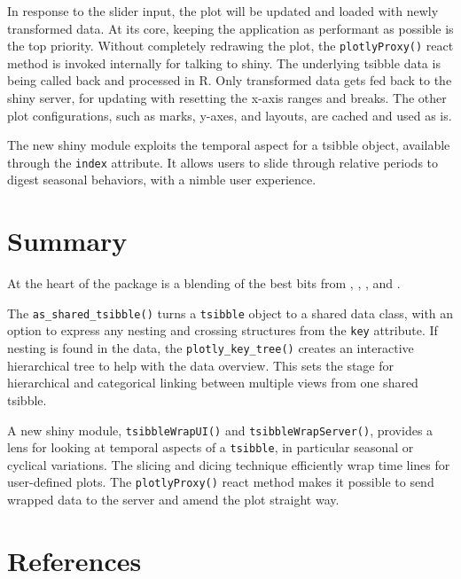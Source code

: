 In response to the slider input, the plot will be updated and loaded with newly transformed data. At its core, keeping the application as performant as possible is the top priority. Without completely redrawing the plot, the \texttt{plotlyProxy()} react method is invoked internally for talking to shiny. The underlying tsibble data is being called back and processed in R. Only transformed data gets fed back to the shiny server, for updating with resetting the x-axis ranges and breaks. The other plot configurations, such as marks, y-axes, and layouts, are cached and used as is.

The new shiny module exploits the temporal aspect for a tsibble object, available through the \texttt{index} attribute. It allows users to slide through relative periods to digest seasonal behaviors, with a nimble user experience.

\hypertarget{summary}{%
\section{Summary}\label{summary}}

At the heart of the  package is a blending of the best bits from , , , and .

The \texttt{as\_shared\_tsibble()} turns a \texttt{tsibble} object to a shared data class, with an option to express any nesting and crossing structures from the \texttt{key} attribute. If nesting is found in the data, the \texttt{plotly\_key\_tree()} creates an interactive hierarchical tree to help with the data overview. This sets the stage for hierarchical and categorical linking between multiple views from one shared tsibble.

A new shiny module, \texttt{tsibbleWrapUI()} and \texttt{tsibbleWrapServer()}, provides a lens for looking at temporal aspects of a \texttt{tsibble}, in particular seasonal or cyclical variations. The slicing and dicing technique efficiently wrap time lines for user-defined plots. The \texttt{plotlyProxy()} react method makes it possible to send wrapped data to the server and amend the plot straight way.

\hypertarget{references}{%
\section*{References}\label{references}}

